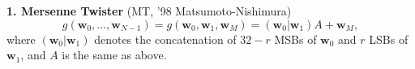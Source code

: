 \documentclass[a4j,12pt,landscape]{jarticle}
\def\F2{{\mathbb F}_2}
\def\bx{{{\mathbf x}}}
\def\bw{{{\mathbf w}}}
\begin{document}




\newpage
{\bf 1. Mersenne Twister} (MT, '98 Matsumoto-Nishimura)
$$
g(\bw_0,\ldots,\bw_{N-1}) = g(\bw_0, \bw_1, \bw_M) = (\bw_0|\bw_1)A + \bw_M,
$$
where $(\bw_0|\bw_1)$ denotes
the concatenation of $32-r$ MSBs of $\bw_0$ and $r$ LSBs of $\bw_1$,
and $A$ is the same as above.
\end{document}
